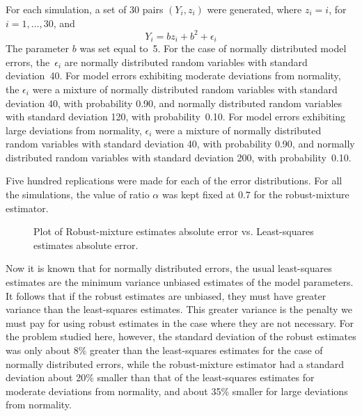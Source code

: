 \documentclass{admbmanual}
\begin{document}
For each simulation, a set of 30 pairs $(Y_i,z_i)$ were generated, where
$z_i=i$, \mbox{for $i=1,\ldots,30$}, and
\begin{equation*}
  Y_i=bz_i+b^2+\epsilon_i
\end{equation*}
The parameter $b$ was set equal to~5. For the case of normally distributed model
errors, the~$\epsilon_i$ are normally distributed random variables with standard
deviation~40. For model errors exhibiting moderate deviations from normality,
the $\epsilon_i$ were a mixture of normally distributed random variables with
standard deviation 40, with probability 0.90, and normally distributed random
variables with standard deviation 120, with probability~0.10. For model errors
exhibiting large deviations from normality, $\epsilon_i$ were a mixture of
normally distributed random variables with standard deviation 40, with
probability 0.90, and normally distributed random variables with standard
deviation 200, with probability~0.10.

Five hundred replications were made for each of the error distributions. For all
the simulations, the value of ratio $\alpha$ was kept fixed at $0.7$ for the
robust-mixture estimator.

\begin{wrapfigure}{r}{.45\textwidth}%
  \centering
  \vspace*{-.75\baselineskip}%
  { \par}%
  \caption{Plot of Robust-mixture estimates absolute error vs. Least-squares
    estimates absolute error.}%
  \label{fig:monte-carlo-03}
\end{wrapfigure}

Now it is known that for normally distributed errors, the usual least-squares
estimates are the minimum variance unbiased estimates of the model parameters.
It follows that if the robust estimates are unbiased, they must have greater
variance than the least-squares estimates. This greater variance is the penalty
we must pay for using robust estimates in the case where they are not necessary.
For the problem studied here, however, the standard deviation of the robust
estimates was only about 8\% greater than the least-squares estimates for the
case of normally distributed errors, while the robust-mixture estimator had a
standard deviation about 20\% smaller than that of the least-squares estimates
for moderate deviations from normality, and about 35\% smaller for large
deviations from normality.
\end{document}
